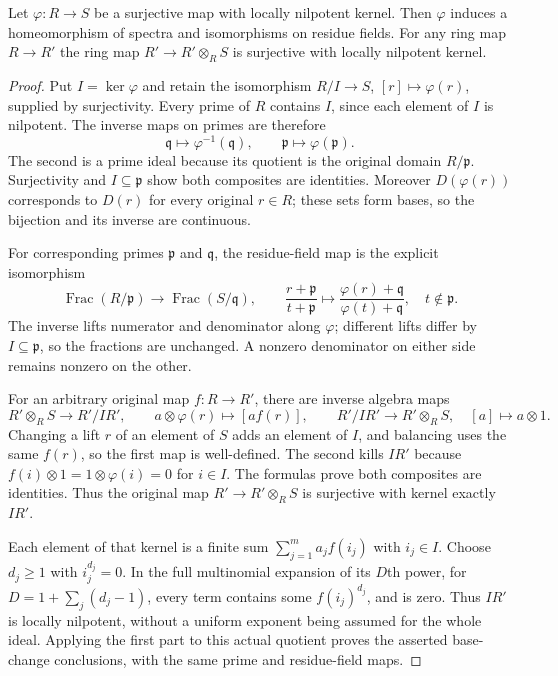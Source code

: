 \begin{lemma}
\label{lemma-surjective-locally-nilpotent-kernel}
Let $\varphi : R \to S$ be a surjective map with locally nilpotent kernel.
Then $\varphi$ induces a homeomorphism of spectra and isomorphisms
on residue fields. For any ring map $R \to R'$ the ring map
$R' \to R' \otimes_R S$ is surjective with locally nilpotent kernel.
\end{lemma}

\begin{proof}
Put $I=\ker\varphi$ and retain the isomorphism
$R/I\to S$, $[r]\mapsto\varphi(r)$, supplied
by surjectivity. Every prime of $R$ contains
$I$, since each element of $I$ is nilpotent.
The inverse maps on primes are therefore
$$
\mathfrak q\longmapsto\varphi^{-1}(\mathfrak q),
\qquad \mathfrak p\longmapsto\varphi(\mathfrak p).
$$
The second is a prime ideal because its
quotient is the original domain $R/\mathfrak p$.
Surjectivity and $I\subseteq\mathfrak p$
show both composites are identities.
Moreover $D(\varphi(r))$ corresponds to
$D(r)$ for every original $r\in R$;
these sets form bases, so the bijection
and its inverse are continuous.

For corresponding primes $\mathfrak p$
and $\mathfrak q$, the residue-field map is
the explicit isomorphism
$$
\operatorname{Frac}(R/\mathfrak p)
\longrightarrow\operatorname{Frac}(S/\mathfrak q),
\qquad
\frac{r+\mathfrak p}{t+\mathfrak p}
\longmapsto
\frac{\varphi(r)+\mathfrak q}{\varphi(t)+\mathfrak q},
\quad t\notin\mathfrak p.
$$
The inverse lifts numerator and denominator
along $\varphi$; different lifts differ by
$I\subseteq\mathfrak p$, so the fractions
are unchanged. A nonzero denominator on
either side remains nonzero on the other.

For an arbitrary original map $f:R\to R'$,
there are inverse algebra maps
$$
R'\otimes_R S\longrightarrow R'/IR',\qquad
a\otimes\varphi(r)\longmapsto[af(r)],
\qquad
R'/IR'\longrightarrow R'\otimes_R S,\quad
[a]\longmapsto a\otimes1.
$$
Changing a lift $r$ of an element of $S$
adds an element of $I$, and balancing
uses the same $f(r)$, so the first map
is well-defined. The second kills $IR'$
because $f(i)\otimes1=1\otimes\varphi(i)=0$
for $i\in I$. The formulas prove both
composites are identities. Thus the
original map $R'\to R'\otimes_R S$ is
surjective with kernel exactly $IR'$.

Each element of that kernel is a finite
sum $\sum_{j=1}^m a_j f(i_j)$ with $i_j\in I$.
Choose $d_j\geq1$ with $i_j^{d_j}=0$.
In the full multinomial expansion of its
$D$th power, for $D=1+\sum_j(d_j-1)$,
every term contains some $f(i_j)^{d_j}$,
and is zero. Thus $IR'$ is locally
nilpotent, without a uniform exponent
being assumed for the whole ideal.
Applying the first part to this actual
quotient proves the asserted base-change
conclusions, with the same prime and
residue-field maps.


\end{proof}
